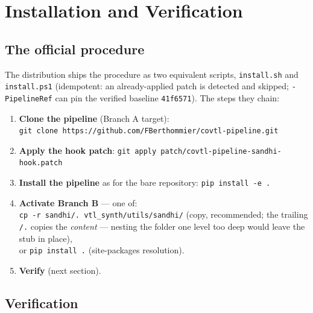 \documentclass[11pt,a4paper]{report}
\newcommand{\smp}[1]{\texttt{#1}}          %
\begin{document}
\chapter{Installation and Verification}
\label{chap:install}

\section{The official procedure}

The distribution ships the procedure as two equivalent scripts,
\smp{install.sh} and \smp{install.ps1} (idempotent: an already-applied patch
is detected and skipped; \smp{-PipelineRef} can pin the verified baseline
\smp{41f6571}). The steps they chain:

\begin{enumerate}
  \item \textbf{Clone the pipeline} (Branch A target):\\
        \smp{git clone https://github.com/FBerthommier/covtl-pipeline.git}
  \item \textbf{Apply the hook patch}: \smp{git apply
        patch/covtl-pipeline-sandhi-hook.patch}
  \item \textbf{Install the pipeline} as for the bare repository:
        \smp{pip install -e .}
  \item \textbf{Activate Branch B} — one of:\\
        \smp{cp -r sandhi/. vtl\_synth/utils/sandhi/} (copy, recommended;
        the trailing \smp{/.} copies the \emph{content} — nesting the
        folder one level too deep would leave the stub in place),\\
        or \smp{pip install .} (site-packages resolution).
  \item \textbf{Verify} (next section).
\end{enumerate}

\section{Verification}
\end{document}
